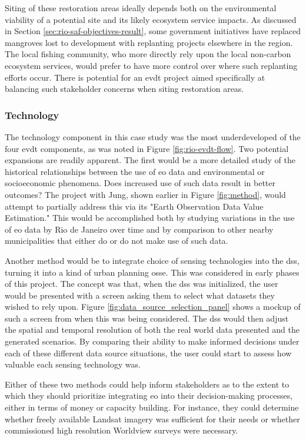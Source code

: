 Siting of these restoration areas ideally depends both on the environmental viability of a potential site and its likely ecosystem service impacts. As discussed in Section \ref{sec:rio-saf-objectives-result}, some government initiatives have replaced mangroves lost to development with replanting projects elsewhere in the region. The local fishing community, who more directly rely upon the local non-carbon ecosystem services, would prefer to have more control over where such replanting efforts occur. There is potential for an \ac{evdt} project aimed specifically at balancing such stakeholder concerns when siting restoration areas.


\subsubsection{Technology}

The technology component in this case study was the most underdeveloped of the four \ac{evdt} components, as was noted in Figure \ref{fig:rio-evdt-flow}. Two potential expansions are readily apparent. The first would be a more detailed study of the historical relationships between the use of \ac{eo} data and environmental or socioeconomic phenomena. Does increased use of such data result in better outcomes? The project with Jung, shown earlier in Figure \ref{fig:method}, would attempt to partially address this via its "Earth Observation Data Value Estimation." This would be accomplished both by studying variations in the use of \ac{eo} data by Rio de Janeiro over time and by comparison to other nearby municipalities that either do or do not make use of such data. 

Another method would be to integrate choice of sensing technologies into the \ac{dss}, turning it into a kind of urban planning \ac{osse}. This was considered in early phases of this project. The concept was that, when the \ac{dss} was initialized, the user would be presented with a screen asking them to select what datasets they wished to rely upon. Figure \ref{fig:data_source_selection_panel} shows a mockup of such a screen from when this was being considered. The \ac{dss} would then adjust the spatial and temporal resolution of both the real world data presented and the generated scenarios. By comparing their ability to make informed decisions under each of these different data source situations, the user could start to assess how valuable each sensing technology was. 

Either of these two methods could help inform stakeholders as to the extent to which they should prioritize integrating \ac{eo} into their decision-making processes, either in terms of money or capacity building. For instance, they could determine whether freely available Landsat imagery was sufficient for their needs or whether commissioned high resolution Worldview surveys were necessary. 

